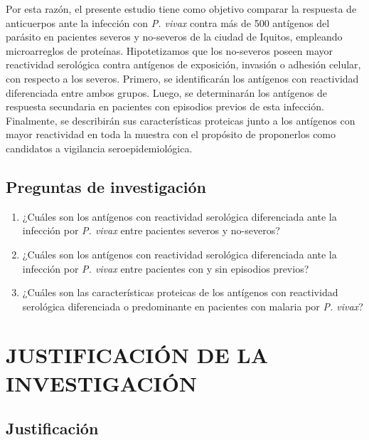 \documentclass[a4paper]{article}
\begin{document}
Por esta razón, el presente estudio tiene como objetivo comparar la
respuesta de anticuerpos ante la infección con \emph{P. vivax} contra
más de 500 antígenos del parásito en pacientes severos y no-severos de
la ciudad de Iquitos, empleando microarreglos de proteínas.
Hipotetizamos que los no-severos poseen mayor reactividad serológica
contra antígenos de exposición, invasión o adhesión celular, con
respecto a los severos. Primero, se identificarán los antígenos con
reactividad diferenciada entre ambos grupos. Luego, se determinarán los
antígenos de respuesta secundaria en pacientes con episodios previos de
esta infección. Finalmente, se describirán sus características proteicas
junto a los antígenos con mayor reactividad en toda la muestra con el
propósito de proponerlos como candidatos a vigilancia
seroepidemiológica.

\subsection{Preguntas de
investigación}\label{preguntas-de-investigacion}

\begin{enumerate}
\def\labelenumi{\arabic{enumi}.}
\item
  ¿Cuáles son los antígenos con reactividad serológica diferenciada ante
  la infección por \emph{P. vivax} entre pacientes severos y no-severos?
\item
  ¿Cuáles son los antígenos con reactividad serológica diferenciada ante
  la infección por \emph{P. vivax} entre pacientes con y sin episodios
  previos?
\item
  ¿Cuáles son las características proteicas de los antígenos con
  reactividad serológica diferenciada o predominante en pacientes con
  malaria por \emph{P. vivax}?
\end{enumerate}

\section{JUSTIFICACIÓN DE LA
INVESTIGACIÓN}\label{justificacion-de-la-investigacion}

\subsection{Justificación}\label{justif}
\end{document}
